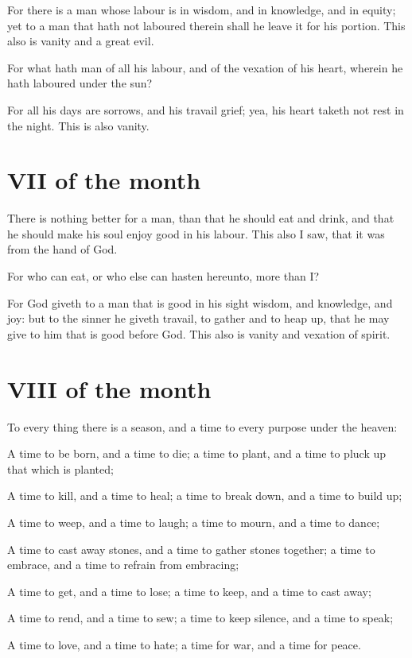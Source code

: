 For there is a man whose labour is in wisdom, and in knowledge, and in equity; yet to a man that hath not laboured therein shall he leave it for his portion. This also is vanity and a great evil.

For what hath man of all his labour, and of the vexation of his heart, wherein he hath laboured under the sun?

For all his days are sorrows, and his travail grief; yea, his heart taketh not rest in the night. This is also vanity.

\section*{VII of the month}

There is nothing better for a man, than that he should eat and drink, and that he should make his soul enjoy good in his labour. This also I saw, that it was from the hand of God.

For who can eat, or who else can hasten hereunto, more than I?

For God giveth to a man that is good in his sight wisdom, and knowledge, and joy: but to the sinner he giveth travail, to gather and to heap up, that he may give to him that is good before God. This also is vanity and vexation of spirit.

\section*{VIII of the month}

To every thing there is a season, and a time to every purpose under the heaven:

A time to be born, and a time to die; a time to plant, and a time to pluck up that which is planted;

A time to kill, and a time to heal; a time to break down, and a time to build up;

A time to weep, and a time to laugh; a time to mourn, and a time to dance;

A time to cast away stones, and a time to gather stones together; a time to embrace, and a time to refrain from embracing;

A time to get, and a time to lose; a time to keep, and a time to cast away;

A time to rend, and a time to sew; a time to keep silence, and a time to speak;

 A time to love, and a time to hate; a time for war, and a time for peace.


